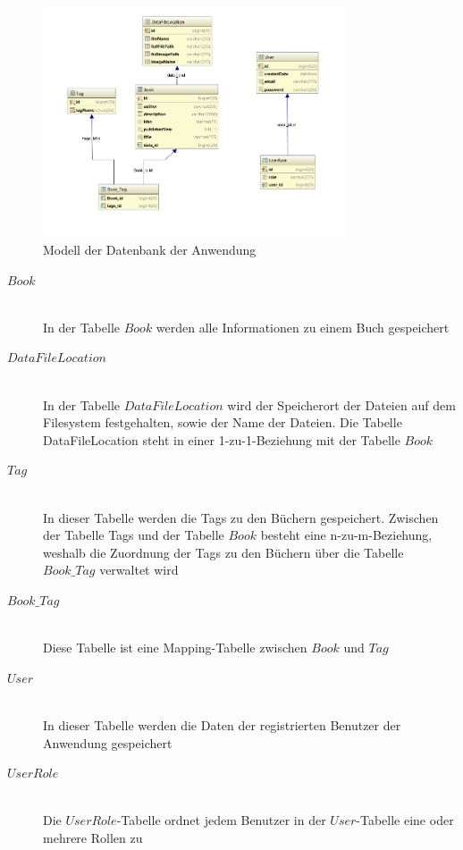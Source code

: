 \documentclass[12pt,a4paper]{book}
\begin{document}
		\begin{figure}[ht]
			\centering
			\includegraphics[width=0.8\textwidth]{Images/database.png}
			\caption[Datenbankdiagram]{Modell der Datenbank der Anwendung}
			\label{database}
		\end{figure}
		
		\begin{description}
			\item[\underline{$Book$}] \hfill \\
				In der Tabelle $Book$  werden alle Informationen zu einem Buch gespeichert
			\item[\underline{$DataFileLocation$}] \hfill \\
			In der Tabelle $DataFileLocation$  wird der Speicherort der Dateien auf dem Filesystem festgehalten, sowie der Name der Dateien. Die Tabelle DataFileLocation steht in einer 1-zu-1-Beziehung mit der Tabelle $Book$
			\item[\underline{$Tag$}]\hfill \\
				In dieser Tabelle werden die Tags zu den Büchern gespeichert. Zwischen der Tabelle Tags und der Tabelle $Book$ besteht eine n-zu-m-Beziehung, weshalb die Zuordnung der Tags zu den Büchern über die Tabelle $Book\_Tag$ verwaltet wird
				\item[\underline{$Book\_Tag$}]\hfill \\
				Diese Tabelle ist eine Mapping-Tabelle zwischen $Book$ und $Tag$
				\item[\underline{$User$}]\hfill \\
				In dieser Tabelle werden die Daten der registrierten Benutzer der Anwendung gespeichert
				\item[\underline{$UserRole$}]\hfill \\
				Die $UserRole$-Tabelle ordnet jedem Benutzer in der $User$-Tabelle eine oder mehrere Rollen zu
		\end{description}
\end{document}
